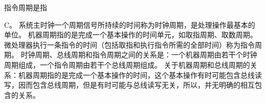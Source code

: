 \question 指令周期是指
\par{}
\begin{solution}C。
系统主时钟一个周期信号所持续的时间称为时钟周期，是处理操作最基本的单位。
机器周期指的是完成一个基本操作的时间单元，如取指周期、取数周期。
微处理器执行一条指令的时间（包括取指和执行指令所需的全部时间）称为指令周期。
时钟周期、总线周期和指令周期之间的关系是：一个机器周期由若干个时钟周期组成，一个指令周期由若干个总线周期组成。
关于机器周期和总线周期的关系：机器周期指的是完成一个基本操作的时间，这个基本操作有时可能包含总线读写，因而包含总线周期，但是有时可能与总线读写无关，所以，并无明确的相互包含的关系。
\end{solution}
